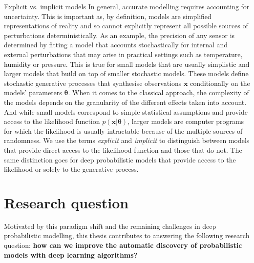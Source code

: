 \begin{side_note}{Explicit vs. implicit models}
  In general, accurate modelling requires accounting for uncertainty. This is important as, by definition, models are simplified representations of reality and so cannot explicitly represent all possible sources of perturbations deterministically. As an example, the precision of any sensor is determined by fitting a model that accounts stochastically for internal and external perturbations that may arise in practical settings such as temperature, humidity or pressure. This is true for small models that are usually simplistic and larger models that build on top of smaller stochastic models. These models define stochastic generative processes that synthesise observations $\mathbf{x}$ conditionally on the models' parameters $\mathbf{\theta}$. When it comes to the classical approach, the complexity of the models depends on the granularity of the different effects taken into account. And while small models correspond to simple statistical assumptions and provide access to the likelihood function $p(\mathbf{x}|\mathbf{\theta})$, larger models are computer programs for which the likelihood is usually intractable because of the multiple sources of randomness. We use the terms \textit{explicit} and \textit{implicit} to distinguish between models that provide direct access to the likelihood function and those that do not. The same distinction goes for deep probabilistic models that provide access to the likelihood or solely to the generative process.
\end{side_note}
\section{Research question}

Motivated by this paradigm shift and the remaining challenges in deep probabilistic modelling, this thesis contributes to answering the following research question: \textbf{how can we improve the automatic discovery of probabilistic models with deep learning algorithms?}


